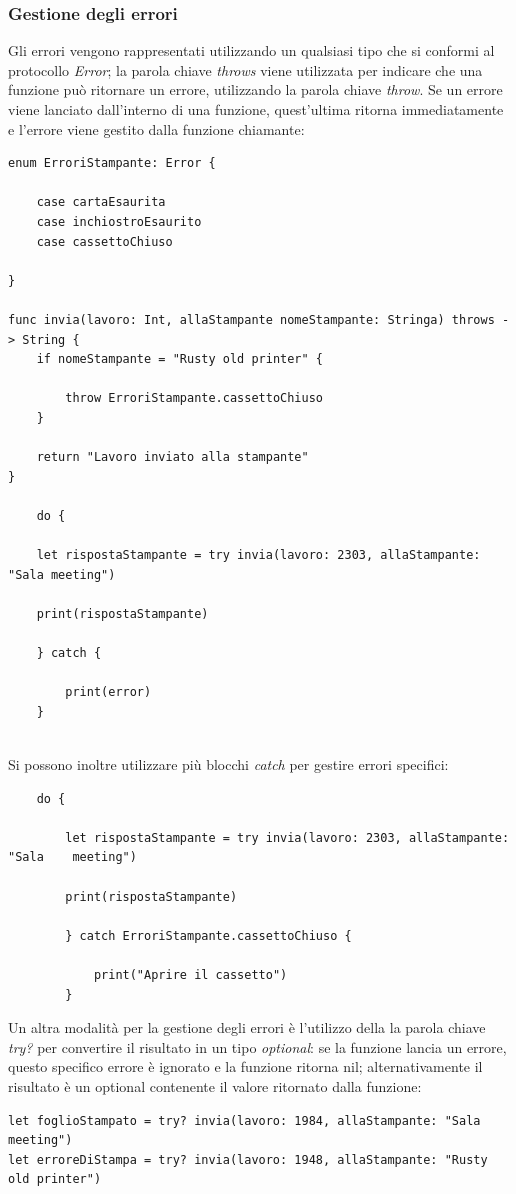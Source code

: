 \subsubsection{Gestione degli errori}
Gli errori vengono rappresentati utilizzando un qualsiasi tipo che si conformi al protocollo \textit{Error}; la parola chiave \textit{throws} viene utilizzata per indicare che una funzione può ritornare un errore, utilizzando la parola chiave \textit{throw}. Se un errore viene lanciato dall'interno di una funzione, quest'ultima ritorna immediatamente e l'errore viene gestito dalla funzione chiamante:
\lstset{language=[Objective]C, breakindent=40pt, breaklines}
\begin{lstlisting}
enum ErroriStampante: Error {

	case cartaEsaurita
	case inchiostroEsaurito
	case cassettoChiuso
	
}

func invia(lavoro: Int, allaStampante nomeStampante: Stringa) throws -> String {
	if nomeStampante = "Rusty old printer" {
		
		throw ErroriStampante.cassettoChiuso
	}

	return "Lavoro inviato alla stampante"
}

	do {
	
	let rispostaStampante = try invia(lavoro: 2303, allaStampante: "Sala meeting")
	
	print(rispostaStampante)
	
	} catch {
		
		print(error)
	}
	
\end{lstlisting}
Si possono inoltre utilizzare più blocchi \textit{catch} per gestire errori specifici:
\lstset{language=[Objective]C, breakindent=40pt, breaklines}
\begin{lstlisting}
	do {
	
		let rispostaStampante = try invia(lavoro: 2303, allaStampante: "Sala 	meeting")
	
		print(rispostaStampante)
	
		} catch ErroriStampante.cassettoChiuso {
		
			print("Aprire il cassetto")
		}
\end{lstlisting}
Un altra modalità per la gestione degli errori è l'utilizzo della la parola chiave \textit{try?} per convertire il risultato in un tipo \textit{optional}: se la funzione lancia un errore, questo specifico errore è ignorato e la funzione ritorna nil; alternativamente il risultato è un optional contenente il valore ritornato dalla funzione:
\lstset{language=[Objective]C, breakindent=40pt, breaklines}
\begin{lstlisting}
let foglioStampato = try? invia(lavoro: 1984, allaStampante: "Sala meeting")
let erroreDiStampa = try? invia(lavoro: 1948, allaStampante: "Rusty old printer")
\end{lstlisting}
